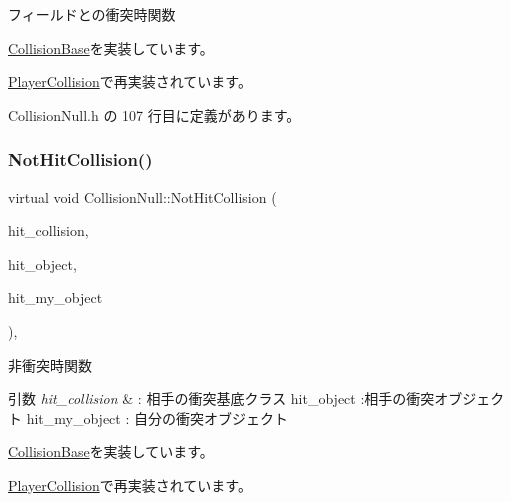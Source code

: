フィールドとの衝突時関数 



\mbox{\hyperlink{class_collision_base_a48c9d1d9e4286cde5054d4d2aa70bdd8}{Collision\+Base}}を実装しています。



\mbox{\hyperlink{class_player_collision_a3522ce17b1e1752f2737c2243582ecb0}{Player\+Collision}}で再実装されています。



 Collision\+Null.\+h の 107 行目に定義があります。

\mbox{\label{class_collision_null_aba2a574ab42dca618c41dd0b9562f614}} 
\subsubsection{\texorpdfstring{Not\+Hit\+Collision()}{NotHitCollision()}}
{\footnotesize\ttfamily virtual void Collision\+Null\+::\+Not\+Hit\+Collision (\begin{DoxyParamCaption}\item[{\mbox{\hyperlink{class_collision_base}{Collision\+Base}} $\ast$}]{hit\+\_\+collision,  }\item[{\mbox{\hyperlink{class_collision_object}{Collision\+Object}} $\ast$}]{hit\+\_\+object,  }\item[{\mbox{\hyperlink{class_collision_object}{Collision\+Object}} $\ast$}]{hit\+\_\+my\+\_\+object }\end{DoxyParamCaption})\hspace{0.3cm}{\ttfamily [inline]}, {\ttfamily [virtual]}}



非衝突時関数 


\begin{DoxyParams}{引数}
{\em hit\+\_\+collision} & \+: 相手の衝突基底クラス hit\+\_\+object \+:相手の衝突オブジェクト hit\+\_\+my\+\_\+object \+: 自分の衝突オブジェクト \\
\hline
\end{DoxyParams}


\mbox{\hyperlink{class_collision_base_a9b64fc5c3f2aac2a05296985ef799fb1}{Collision\+Base}}を実装しています。



\mbox{\hyperlink{class_player_collision_a21b8f825ea142024212ab5fe3f427ab0}{Player\+Collision}}で再実装されています。



